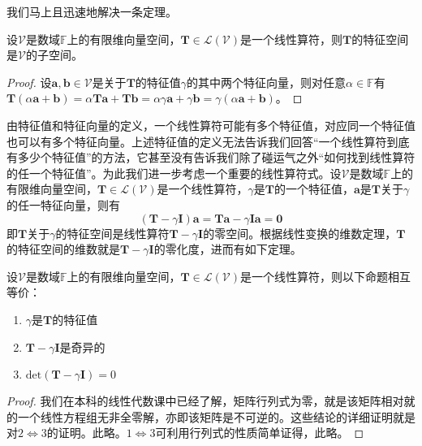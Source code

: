 \documentclass[main.tex]{subfiles}
\begin{document}
我们马上且迅速地解决一条定理。

\begin{theorem}
设$\mathcal{V}$是数域$\mathbb{F}$上的有限维向量空间，$\mathbf{T}\in\mathcal{L}\left(\mathcal{V}\right)$是一个线性算符，则$\mathbf{T}$的特征空间是$\mathcal{V}$的子空间。
\end{theorem}
\begin{proof}
设$\mathbf{a},\mathbf{b}\in\mathcal{V}$是关于$\mathbf{T}$的特征值$\gamma$的其中两个特征向量，则对任意$\alpha\in\mathbb{F}$有$\mathbf{T}\left(\alpha\mathbf{a}+\mathbf{b}\right)=\alpha\mathbf{Ta}+\mathbf{Tb}=\alpha\gamma\mathbf{a}+\gamma\mathbf{b}=\gamma\left(\alpha\mathbf{a}+\mathbf{b}\right)$。
\end{proof}

由特征值和特征向量的定义，一个线性算符可能有多个特征值，对应同一个特征值也可以有多个特征向量。上述特征值的定义无法告诉我们回答“一个线性算符到底有多少个特征值”的方法，它甚至没有告诉我们除了碰运气之外“如何找到线性算符的任一个特征值”。为此我们进一步考虑一个重要的线性算符式。设$\mathcal{V}$是数域$\mathbb{F}$上的有限维向量空间，$\mathbf{T}\in\mathcal{L}\left(\mathcal{V}\right)$是一个线性算符，$\gamma$是$\mathbf{T}$的一个特征值，$\mathbf{a}$是$\mathbf{T}$关于$\gamma$的任一特征向量，则有
\[\left(\mathbf{T}-\gamma\mathbf{I}\right)\mathbf{a}=\mathbf{Ta}-\gamma\mathbf{Ia}=\mathbf{0}\]
即$\mathbf{T}$关于$\gamma$的特征空间是线性算符$\mathbf{T}-\gamma\mathbf{I}$的零空间。根据线性变换的维数定理，$\mathbf{T}$的特征空间的维数就是$\mathbf{T}-\gamma\mathbf{I}$的零化度，进而有如下定理。

\begin{theorem}
设$\mathcal{V}$是数域$\mathbb{F}$上的有限维向量空间，$\mathbf{T}\in\mathcal{L}\left(\mathcal{V}\right)$是一个线性算符，则以下命题相互等价：
\begin{enumerate}
    \item $\gamma$是$\mathbf{T}$的特征值
    \item $\mathbf{T}-\gamma\mathbf{I}$是奇异的
    \item $\mathrm{det}\left(\mathbf{T}-\gamma\mathbf{I}\right)=0$
\end{enumerate}
\begin{proof}
我们在本科的线性代数课中已经了解，矩阵行列式为零，就是该矩阵相对就的一个线性方程组无非全零解，亦即该矩阵是不可逆的。这些结论的详细证明就是对$2\Leftrightarrow 3$的证明。此略。$1\Leftrightarrow 3$可利用行列式的性质简单证得，此略。
\end{proof}
\end{theorem}
\end{document}
